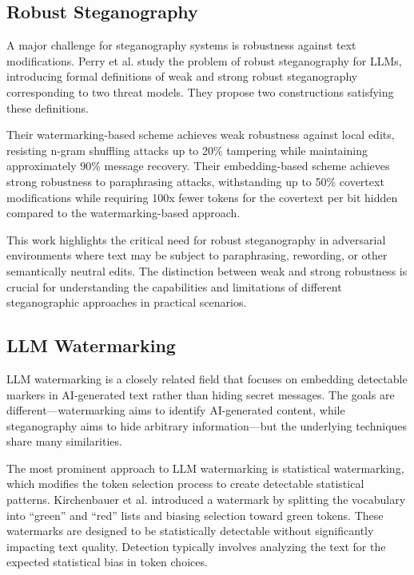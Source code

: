 \documentclass[sigconf,review,anonymous]{acmart}
\begin{document}
\subsection{Robust Steganography}

A major challenge for steganography systems is robustness against text modifications. Perry et al. \cite{perry2025robust} study the problem of robust steganography for LLMs, introducing formal definitions of weak and strong robust steganography corresponding to two threat models. They propose two constructions satisfying these definitions.

Their watermarking-based scheme achieves weak robustness against local edits, resisting n-gram shuffling attacks up to 20\% tampering while maintaining approximately 90\% message recovery. Their embedding-based scheme achieves strong robustness to paraphrasing attacks, withstanding up to 50\% covertext modifications while requiring 100x fewer tokens for the covertext per bit hidden compared to the watermarking-based approach.

This work highlights the critical need for robust steganography in adversarial environments where text may be subject to paraphrasing, rewording, or other semantically neutral edits. The distinction between weak and strong robustness is crucial for understanding the capabilities and limitations of different steganographic approaches in practical scenarios.

\subsection{LLM Watermarking}

LLM watermarking is a closely related field that focuses on embedding detectable markers in AI-generated text rather than hiding secret messages. The goals are different---watermarking aims to identify AI-generated content, while steganography aims to hide arbitrary information---but the underlying techniques share many similarities.

The most prominent approach to LLM watermarking is statistical watermarking, which modifies the token selection process to create detectable statistical patterns. Kirchenbauer et al. \cite{kirchenbauer2023watermark} introduced a watermark by splitting the vocabulary into ``green'' and ``red'' lists and biasing selection toward green tokens. These watermarks are designed to be statistically detectable without significantly impacting text quality. Detection typically involves analyzing the text for the expected statistical bias in token choices.
\end{document}
